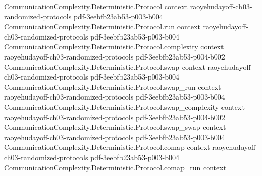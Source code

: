 \begin{theorem}
\label{CommunicationComplexity.PublicCoin.lt_communicationComplexity_of_forall_distributionalError_gt}
\leanok
{}
\proofstep
  {CommunicationComplexity.Deterministic.Protocol}
  {context}
  {raoyehudayoff-ch03-randomized-protocols}
  {pdf-3eebfb23ab53-p003-b004}
\proofstep
  {CommunicationComplexity.Deterministic.Protocol.run}
  {context}
  {raoyehudayoff-ch03-randomized-protocols}
  {pdf-3eebfb23ab53-p003-b004}
\proofstep
  {CommunicationComplexity.Deterministic.Protocol.complexity}
  {context}
  {raoyehudayoff-ch03-randomized-protocols}
  {pdf-3eebfb23ab53-p004-b002}
\proofstep
  {CommunicationComplexity.Deterministic.Protocol.swap}
  {context}
  {raoyehudayoff-ch03-randomized-protocols}
  {pdf-3eebfb23ab53-p003-b004}
\proofstep
  {CommunicationComplexity.Deterministic.Protocol.swap_run}
  {context}
  {raoyehudayoff-ch03-randomized-protocols}
  {pdf-3eebfb23ab53-p003-b004}
\proofstep
  {CommunicationComplexity.Deterministic.Protocol.swap_complexity}
  {context}
  {raoyehudayoff-ch03-randomized-protocols}
  {pdf-3eebfb23ab53-p004-b002}
\proofstep
  {CommunicationComplexity.Deterministic.Protocol.swap_swap}
  {context}
  {raoyehudayoff-ch03-randomized-protocols}
  {pdf-3eebfb23ab53-p003-b004}
\proofstep
  {CommunicationComplexity.Deterministic.Protocol.comap}
  {context}
  {raoyehudayoff-ch03-randomized-protocols}
  {pdf-3eebfb23ab53-p003-b004}
\proofstep
  {CommunicationComplexity.Deterministic.Protocol.comap_run}
  {context}

\end{theorem}
